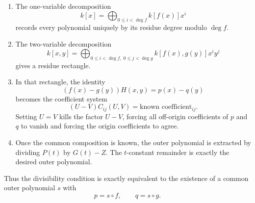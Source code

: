 \documentclass[11pt]{article}
\theoremstyle{plain}
\theoremstyle{definition}
\theoremstyle{remark}
\newcommand{\U}{U}
\newcommand{\V}{V}
\begin{document}
\begin{enumerate}
    \item The one-variable decomposition
    \[
        k[x]=\bigoplus_{0\leq i<\deg f} k[f(x)]x^i
    \]
    records every polynomial uniquely by its residue degree modulo \(\deg f\).

    \item The two-variable decomposition
    \[
        k[x,y]
        =
        \bigoplus_{0\leq i<\deg f,\;0\leq j<\deg g}
        k[f(x),g(y)]x^i y^j
    \]
    gives a residue rectangle.

    \item In that rectangle, the identity
    \[
        (f(x)-g(y))H(x,y)=p(x)-q(y)
    \]
    becomes the coefficient system
    \[
        (\U-\V)C_{ij}(\U,\V)=\text{known coefficient}_{ij}.
    \]
    Setting \(\U=\V\) kills the factor \(\U-\V\), forcing all off-origin coefficients of \(p\) and \(q\) to vanish and forcing the origin coefficients to agree.

    \item Once the common composition is known, the outer polynomial is extracted by dividing \(P(t)\) by \(G(t)-Z\). The \(t\)-constant remainder is exactly the desired outer polynomial.
\end{enumerate}

Thus the divisibility condition is exactly equivalent to the existence of a common outer polynomial \(s\) with
\[
    p=s\circ f,
    \qquad
    q=s\circ g.
\]
\end{document}

